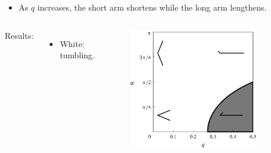 \documentclass{beamer}
\newcommand{\bi}{\begin{itemize}}
\newcommand{\ei}{\end{itemize}}
\begin{document}
\begin{frame}
\begin{overlayarea}{\textwidth}{\textheight}
		\vspace{0.1cm} \small
		\bi
		\item As $q$ increases, the short arm shortens while the long arm lengthens.
		\ei  \vspace{-0.15cm}
		\begin{columns}
			Results:
			\bi
			\item White: tumbling.
			\ei 
			\begin{figure}[htb]
				\begin{center}
					\includegraphics[width=0.85\textwidth]{plots/stone.png}
				\end{center}
			\end{figure}
		\end{columns}
	\end{overlayarea}
\end{frame}

\end{document}
